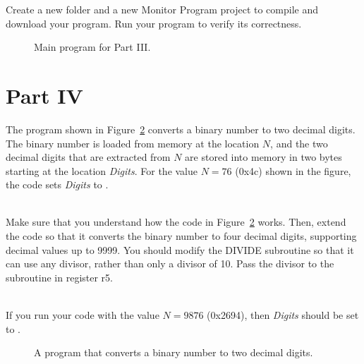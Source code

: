 \documentclass[epsfig,10pt,fullpage]{article}
\newcommand{\CommonDocsPath}{../../../../common/docs}
\begin{document}
Create a new folder and a new Monitor Program project to compile and download your program.
Run your program to verify its correctness.

\begin{figure}[H]
\begin{center}

\end{center}
\caption{Main program for Part III.}
\label{fig:main}
\end{figure}


\section*{Part IV}
The program shown in Figure~\ref{fig:decimal} converts a binary number to two decimal digits.
The binary number is loaded from memory at the location $N$, and the two
decimal digits that are extracted from $N$ are stored into memory in two bytes starting at 
the location {\it Digits}. For the value $N = 76$ ({\sf0x4c}) shown in the figure, the code sets 
{\it Digits} to {}.

~\\

Make sure that you understand how the code in Figure~\ref{fig:decimal} works. Then, extend
the code so that it converts the binary number to four decimal digits, supporting decimal 
values up to 9999. You should modify the DIVIDE subroutine so that it can use any divisor, 
rather than only a divisor of 10. Pass the divisor to the subroutine in register r5.

~\\

If you run your code with the value $N = 9876$ ({\sf0x2694}), then {\it Digits} should be set to 
{}.

\begin{figure}[H]
\begin{center}

\end{center}
\caption{A program that converts a binary number to two decimal digits.}
\label{fig:decimal}
\end{figure}



\end{document}
